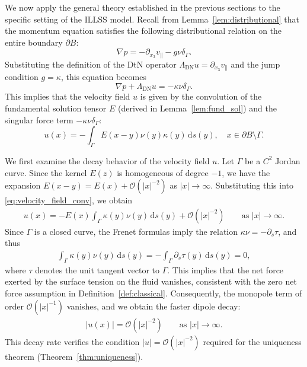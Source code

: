 \documentclass{article}
\theoremstyle{remark}
\theoremstyle{definition}
\numberwithin{equation}{section}
\begin{document}
We now apply the general theory established in the previous sections to the specific setting of the ILLSS model.
Recall from Lemma~\ref{lem:distributional} that the momentum equation satisfies the following distributional relation on the entire boundary $\partial B$:
\begin{equation*}
    \nabla p = -\partial_{x_3}v_\parallel - g\nu\delta_\Gamma.
\end{equation*}
Substituting the definition of the DtN operator $\Lambda_{\mathrm{DN}}u = \partial_{x_3}v_\parallel$ and the jump condition $g=\kappa$, this equation becomes
\begin{equation*}
    \nabla p + \Lambda_{\mathrm{DN}} u = - \kappa \nu \delta_\Gamma.
\end{equation*}
This implies that the velocity field $u$ is given by the convolution of the fundamental solution tensor $E$ (derived in Lemma~\ref{lem:fund_sol}) and the singular force term $-\kappa \nu \delta_\Gamma$:
\begin{equation}
    u(x) = -\int_\Gamma E(x - y) \nu(y) \kappa(y) \,\mathrm{d}s(y), \quad x \in \partial B \setminus \Gamma.
    \label{eq:velocity_field_conv}
\end{equation}

We first examine the decay behavior of the velocity field $u$.  
Let $\Gamma$ be a $C^2$ Jordan curve.
Since the kernel $E(z)$ is homogeneous of degree $-1$, we have the expansion $E(x-y) = E(x) + \mathcal{O}(|x|^{-2})$ as $|x|\to\infty$. Substituting this into \eqref{eq:velocity_field_conv}, we obtain
\begin{align*}
    u(x)
    = -E(x) \int_{\Gamma} \kappa(y)\nu(y) \, \mathrm{d}s(y) + \mathcal{O}\left(|x|^{-2}\right) \qquad \text{as } |x| \to \infty.
\end{align*}
Since $\Gamma$ is a closed curve, the Frenet formulas imply the relation $\kappa\nu = -\partial_s \tau$, and thus
\begin{align*}
    \int_\Gamma \kappa(y)\nu(y) \, \mathrm{d}s(y)
    = -\int_\Gamma \partial_s \tau(y) \, \mathrm{d}s(y)
    = 0,
\end{align*}
where $\tau$ denotes the unit tangent vector to $\Gamma$.
This implies that the net force exerted by the surface tension on the fluid vanishes, consistent with the zero net force assumption in Definition~\ref{def:classical}.
Consequently, the monopole term of order $\mathcal{O}(|x|^{-1})$ vanishes, and we obtain the faster dipole decay:
\begin{align}
    |u(x)| = \mathcal{O}(|x|^{-2}) \qquad \text{as } |x| \to \infty.
    \label{eq:u_decay}
\end{align}
This decay rate verifies the condition $|u|=\mathcal{O}(|x|^{-2})$ required for the uniqueness theorem (Theorem~\ref{thm:uniqueness}).
\end{document}
